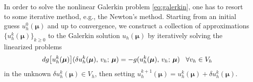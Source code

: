 \documentclass[12pt, a4paper, twoside, openright]{report}
\numberwithin{equation}{chapter}
\theoremstyle{theorem}
\theoremstyle{definition}
\theoremstyle{remark}
\theoremstyle{proposition}
\numberwithin{figure}{chapter}
\newcommand{\bg}[1]{\boldsymbol{#1}}
\begin{document}
		In order to solve the nonlinear Galerkin problem \eqref{eq:galerkin}, one has to resort to some iterative method, e.g., the Newton's method. Starting from an initial guess $u_h^0(\bg{\mu})$ and up to convergence, we construct a collection of approximations $\big\lbrace u_h^k(\bg{\mu}) \big\rbrace_{k \geq 0}$ to the Galerkin solution $u_h(\bg{\mu})$ by iteratively solving the linearized problems
		\begin{equation}
			\label{eq:newton-linearized-problem}
			dg \big[ u_h^k(\bg{\mu}) \big](\delta u_h^k(\bg{\mu}), \, v_h; \, \bg{\mu}) = - g(u_h^k(\bg{\mu}), \, v_h; \, \bg{\mu}) \hspace*{0.3cm} \forall v_h \in V_h
		\end{equation}
		in the unknown $\delta u_h^k(\bg{\mu}) \in V_h$, then setting $u_h^{k+1}(\bg{\mu}) = u_h^k(\bg{\mu}) + \delta u_h^k(\bg{\mu})$. 
		
\end{document}
